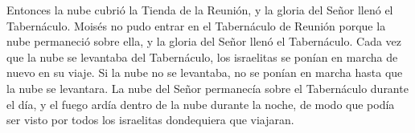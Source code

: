  Entonces la nube cubrió la Tienda de la Reunión, y la
gloria del Señor llenó el Tabernáculo.  Moisés no pudo
entrar en el Tabernáculo de Reunión porque la nube permaneció sobre
ella, y la gloria del Señor llenó el Tabernáculo.  Cada
vez que la nube se levantaba del Tabernáculo, los israelitas se ponían
en marcha de nuevo en su viaje.  Si la nube no se
levantaba, no se ponían en marcha hasta que la nube se levantara.
 La nube del Señor permanecía sobre el Tabernáculo
durante el día, y el fuego ardía dentro de la nube durante la noche, de
modo que podía ser visto por todos los israelitas dondequiera que
viajaran.
